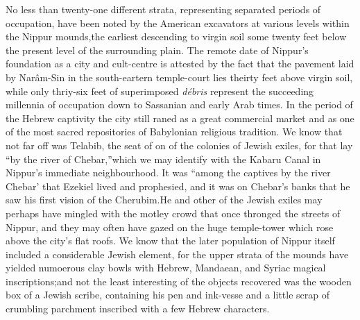 \documentclass[12pt,oneside]{book}
\begin{document}
No less than twenty-one different strata, representing separated periods of occupation, have been noted by the American excavators at various levels within the Nippur mounds,\footnotemark the earliest descending to virgin soil some twenty feet below the present level of the surrounding plain. The remote date of Nippur's foundation as a city and cult-centre is attested by the fact that the pavement laid by Nar\^am-Sin in the south-eartern temple-court lies theirty feet above virgin soil, while only thriy-six feet of superimposed \textit{d\'ebris} represent the succeeding millennia of occupation down to Sassanian and early Arab times. In the period of the Hebrew captivity the city still raned as a great commercial market and as one of the most sacred repositories of Babylonian religious tradition. We know that not far off was Telabib, the seat of on of the colonies of Jewish exiles, for that lay ``by the river of Chebar,''\footnotemark which we may identify with the Kabaru Canal in Nippur's immediate neighbourhood. It was ``among the captives by the river Chebar' that Ezekiel lived and prophesied, and it was on Chebar's banks that he saw his first vision of the Cherubim.\footnotemark He and other of the Jewish exiles may perhaps have mingled with the motley crowd that once thronged the streets of Nippur, and they may often have gazed on the huge temple-tower which rose above the city's flat roofs. We know that the later population of Nippur itself included a considerable Jewish element, for the upper strata of the mounds have yielded numoerous clay bowls with Hebrew, Mandaean, and Syriac magical inscriptions;\footnotemark and not the least interesting of the objects recovered was the wooden box of a Jewish scribe, containing his pen and ink-vesse and a little scrap of crumbling parchment inscribed with a few Hebrew characters.\footnotemark \par 





\end{document}
